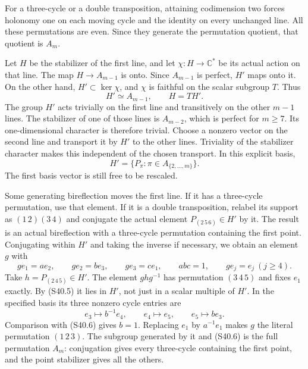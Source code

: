 For a three-cycle or a double transposition, attaining
codimension two forces holonomy one on each moving cycle and
the identity on every unchanged line. All these permutations
are even. Since they generate the permutation quotient, that
quotient is \(A_m\).

Let \(H\) be the stabilizer of the first line, and let
\(\chi:H\to\mathbb C^*\) be its actual action on that
line. The map \(H\to A_{m-1}\) is onto. Since
\(A_{m-1}\) is perfect, \(H'\) maps onto it. On the
other hand, \(H'\subset\ker\chi\), and \(\chi\) is
faithful on the scalar subgroup \(T\). Thus
\[
              H'\simeq A_{m-1},\qquad H=T H'.              \tag{S40.5}
\]
The group \(H'\) acts trivially on the first line and
transitively on the other \(m-1\) lines. The stabilizer of
one of those lines is \(A_{m-2}\), which is perfect for
\(m\ge7\). Its one-dimensional character is therefore
trivial. Choose a nonzero vector on the second line and
transport it by \(H'\) to the other lines. Triviality of
the stabilizer character makes this independent of the chosen
transport. In this explicit basis,
\[
              H'=\{P_\pi:\pi\in A_{\{2,\ldots,m\}}\}.
                                                               \tag{S40.6}
\]
The first basis vector is still free to be rescaled.

Some generating bireflection moves the first line. If it has
a three-cycle permutation, use that element. If it is a double
transposition, relabel its support as
\((1\,2)(3\,4)\) and conjugate the actual element
\(P_{(2\,5\,6)}\in H'\) by it. The result is an actual
bireflection with a three-cycle permutation containing the first
point. Conjugating within \(H'\) and taking the inverse if
necessary, we obtain an element \(g\) with
\[
 ge_1=a e_2,\qquad ge_2=b e_3,\qquad
 ge_3=c e_1,\qquad abc=1,\qquad ge_j=e_j\ (j\ge4).
                                                               \tag{S40.7}
\]
Take \(h=P_{(2\,4\,5)}\in H'\). The element
\(g h g^{-1}\) has permutation \((3\,4\,5)\) and fixes
\(e_1\) exactly. By (S40.5) it lies in \(H'\), not just
in a scalar multiple of \(H'\). In the specified basis its
three nonzero cycle entries are
\[
       e_3\longmapsto b^{-1}e_4,\qquad
       e_4\longmapsto e_5,\qquad e_5\longmapsto b e_3.
                                                               \tag{S40.8}
\]
Comparison with (S40.6) gives \(b=1\). Replacing
\(e_1\) by \(a^{-1}e_1\) makes \(g\) the literal
permutation \((1\,2\,3)\). The subgroup generated by it
and (S40.6) is the full permutation \(A_m\): conjugation
gives every three-cycle containing the first point, and the
point stabilizer gives all the others.

